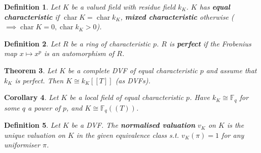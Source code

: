 \documentclass[a4paper]{article}
\newtheorem{definition}{Definition}
\newtheorem{theorem}[definition]{Theorem}
\newtheorem{corollary}[definition]{Corollary}
\DeclareMathOperator{\characteristic}{char}
\begin{document}
\begin{definition}
	Let $K$ be a valued field with residue field $k_K$.
	$K$ has \textbf{equal characteristic} if $\characteristic K = \characteristic k_K$,
	\textbf{mixed characteristic} otherwise ($\implies \characteristic K =0, \characteristic k_K > 0$).
\end{definition}

\begin{definition}
	Let $R$ be a ring of characteristic $p$.
	$R$ is \textbf{perfect} if the Frobenius map $x \mapsto x^p$ is an automorphism of $R$.
\end{definition}

\begin{theorem}
	Let $K$ be a complete DVF of equal characteristic $p$ and assume that $k_K$ is perfect.
	Then $K \cong k_K[[T]]$ (as DVFs).
\end{theorem}

\begin{corollary}
	Let $K$ be a local field of equal characteristic $p$.
	Have $k_K \cong \mathbb{F}_q$ for some $q$ a power of $p$,
	and $K \cong \mathbb{F}_q((T))$.
\end{corollary}

\begin{definition}
	Let $K$ be a DVF.
	The \textbf{normalised valuation} $v_K$ on $K$ is the unique valuation on $K$ in the given equivalence class
	s.t. $v_K(\pi) = 1$ for any uniformiser $\pi$.
\end{definition}
\end{document}
